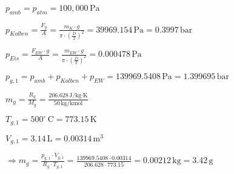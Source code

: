 \( p_{amb} = p_{atm} = 100,000 \, \text{Pa} \)  

\( p_{Kolben} = \frac{F_g}{A} = \frac{m_K \cdot g}{\pi \cdot \left(\frac{D}{2}\right)^2} = 39969.154 \, \text{Pa} = 0.3997 \, \text{bar} \)  

\( p_{Eis} = \frac{F_{EW} \cdot g}{A} = \frac{m_{EW} \cdot g}{\pi \cdot \left(\frac{D}{2}\right)^2} = 0.000478 \, \text{Pa} \)  

\( p_{g,1} = p_{amb} + p_{Kolben} + p_{EW} = 139969.5408 \, \text{Pa} = 1.399695 \, \text{bar} \)  

\( m_g = \frac{R_g}{M_g} = \frac{206.628 \, \text{J/kg·K}}{50 \, \text{kg/kmol}} \)  

\( T_{g,1} = 500^\circ \, \text{C} = 773.15 \, \text{K} \)  

\( V_{g,1} = 3.14 \, \text{L} = 0.00314 \, \text{m}^3 \)  

\( \Rightarrow m_g = \frac{p_{g,1} \cdot V_{g,1}}{R_g \cdot T_{g,1}} = \frac{139969.5408 \cdot 0.00314}{206.628 \cdot 773.15} = 0.00212 \, \text{kg} = 3.42 \, \text{g} \)